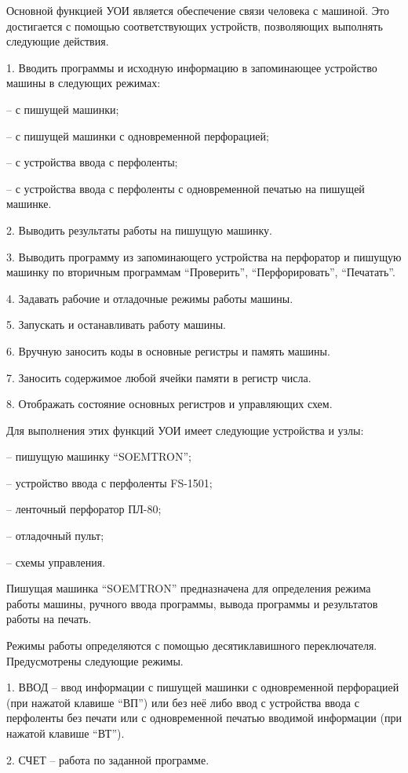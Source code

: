 \documentclass[11pt]{article}
\begin{document}
Основной функцией УОИ является
обеспечение связи человека с машиной.
Это достигается с помощью
соответствующих устройств,
позволяющих выполнять следующие
действия.

1. Вводить программы и исходную
информацию в запоминающее устройство
машины в следующих режимах:

– с пишущей машинки;

– с пишущей машинки с одновременной
перфорацией;

– с устройства ввода с перфоленты;

– с устройства ввода с перфоленты с
одновременной печатью на пишущей
машинке.

2. Выводить результаты работы на
пишущую машинку.

3. Выводить программу из запоминающего
устройства на перфоратор и пишущую
машинку по вторичным программам
“Проверить”, “Перфорировать”,
“Печатать”.

4. Задавать рабочие и отладочные режимы
работы машины.

5. Запускать и останавливать работу
машины.

6. Вручную заносить коды в основные
регистры и память машины.

7. Заносить содержимое любой ячейки
памяти в регистр числа.

8. Отображать состояние основных
регистров и управляющих схем.

Для выполнения этих функций УОИ имеет
следующие устройства и узлы:

– пишущую машинку “SOEMTRON”;

– устройство ввода с перфоленты FS-1501;

– ленточный перфоратор ПЛ-80;

– отладочный пульт;

– схемы управления.

Пишущая машинка “SOEMTRON” предназначена
для определения режима работы машины,
ручного ввода программы, вывода
программы и результатов работы на
печать.

Режимы работы определяются с помощью
десятиклавишного переключателя.
Предусмотрены следующие режимы.

1. ВВОД – ввод информации с пишущей
машинки с одновременной перфорацией
(при нажатой клавише “ВП”) или без неё
либо ввод с устройства ввода с
перфоленты без печати или с
одновременной печатью вводимой
информации (при нажатой клавише “ВТ”).

2. СЧЕТ – работа по заданной программе.
\end{document}
